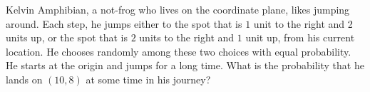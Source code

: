 Kelvin Amphibian, a not-frog who lives on the coordinate plane, likes jumping around. Each step, he jumps either to the spot that is $1$ unit to the right and 2 units up, or the spot that is $2$ units to the right and $1$ unit up, from his current location. He chooses randomly among these two choices with equal probability. He starts at the origin and jumps for a long time. What is the probability that he lands on $(10, 8)$ at some time in his journey?
